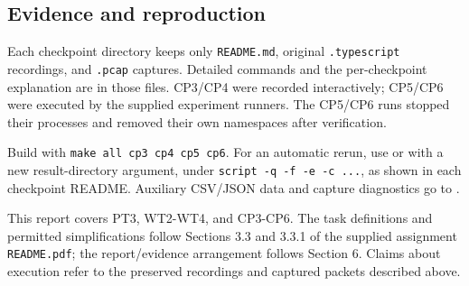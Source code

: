 \documentclass[
  a4paper,
  10pt]{article}
\begin{document}
\subsection{Evidence and reproduction}\label{evidence-and-reproduction}

Each checkpoint directory keeps only \texttt{README.md}, original
\texttt{.typescript} recordings, and \texttt{.pcap} captures. Detailed
commands and the per-checkpoint explanation are in those files. CP3/CP4
were recorded interactively; CP5/CP6 were executed by the supplied
experiment runners. The CP5/CP6 runs stopped their processes and removed
their own namespaces after verification.

Build with \texttt{make\ all\ cp3\ cp4\ cp5\ cp6}. For an automatic
rerun, use {\ttfamily{}} or
{\ttfamily{}} with a new result-directory
argument, under \texttt{script\ -q\ -f\ -e\ -c\ ...}, as shown in each
checkpoint README. Auxiliary CSV/JSON data and capture diagnostics go to
{\ttfamily{}}.

This report covers PT3, WT2-WT4, and CP3-CP6. The task definitions and
permitted simplifications follow Sections 3.3 and 3.3.1 of the supplied
assignment \texttt{README.pdf}; the report/evidence arrangement follows
Section 6. Claims about execution refer to the preserved recordings and
captured packets described above.
\end{document}
